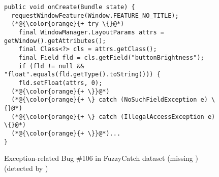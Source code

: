 \begin{figure}[t]%
	\centering
\begin{lstlisting}[]
public void onCreate(Bundle state) {
  requestWindowFeature(Window.FEATURE_NO_TITLE);
  (*@{\color{orange}{+ try \{}@*)
    final WindowManager.LayoutParams attrs = getWindow().getAttributes();
    final Class<?> cls = attrs.getClass();
    final Field fld = cls.getField("buttonBrightness");
    if (fld != null && "float".equals(fld.getType().toString())) {
    fld.setFloat(attrs, 0);
  (*@{\color{orange}{+ \}}@*)
  (*@{\color{orange}{+ \} catch (NoSuchFieldException e) \{}@*)
  (*@{\color{orange}{+ \} catch (IllegalAccessException e) \{}@*)
  (*@{\color{orange}{+ \}}@*)...
}
\end{lstlisting}
        \vspace{-16pt}
        \caption{Exception-related Bug \#106 in FuzzyCatch dataset (missing ) (detected by {\tool})}
        \label{fig:example-bug}
\end{figure}
